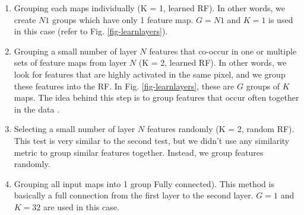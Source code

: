 \documentclass{article} %
\begin{document}
\begin{enumerate}

\item Grouping each maps individually (K = 1, learned RF). In other words, we create $N1$ groups which have only 1 feature map. 
$G = N1$ and $K = 1$ is used in this case (refer to Fig. \ref{fig-learnlayers}).

\item Grouping a small number of layer $N$ features that co-occur in one or multiple sets of feature maps from layer $N$ (K = 2, learned RF). 
In other words, we look for features that are highly activated in the same pixel, and we group these features into the RF.
In Fig. \ref{fig-learnlayers}, these are $G$ groups of $K$ maps.
The idea behind this step is to group features that occur often together in the data \cite{masquelier2007learning}.

\item Selecting a small number of layer $N$ features randomly (K = 2, random RF).
This test is very similar to the second test, but we didn't use any similarity metric to group similar features together.
Instead, we group features randomly.

\item Grouping all input maps into 1 group Fully connected).
This method is basically a full connection from the first layer to the second layer. 
$G = 1$ and $K = 32$ are used in this case.

\end{enumerate}
\end{document}
